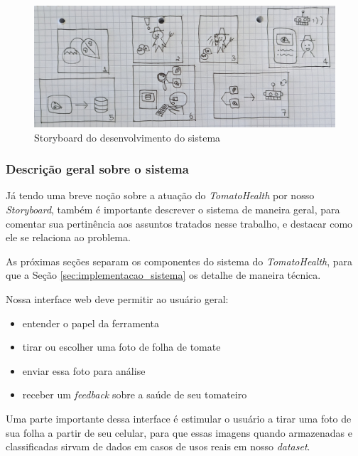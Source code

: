 \begin{figure}[ht]
    \centering
    \includegraphics[width=\textwidth]{images/storyboard.jpg}
    \caption{Storyboard do desenvolvimento do sistema}
    \label{fig:storyboard}
\end{figure}

\subsubsection{{Descrição geral sobre o sistema}}

Já tendo uma breve noção sobre a atuação do \emph{TomatoHealth} por nosso \textit{Storyboard}, também é importante descrever o sistema de maneira geral, para comentar sua pertinência aos assuntos tratados nesse trabalho, e destacar como ele se relaciona ao problema.

As próximas seções separam os componentes do sistema do \emph{TomatoHealth}, para que a Seção \ref{sec:implementacao_sistema} os detalhe de maneira técnica.


Nossa interface web deve permitir ao usuário geral:

\begin{itemize}
    \item entender o papel da ferramenta
    \item tirar ou escolher uma foto de folha de tomate
    \item enviar essa foto para análise
    \item receber um \textit{feedback} sobre a saúde de seu tomateiro
\end{itemize}

Uma parte importante dessa interface é estimular o usuário a tirar uma foto de sua folha a partir de seu celular, para que essas imagens quando armazenadas e classificadas sirvam de dados em casos de usos reais em nosso \textit{dataset}.

